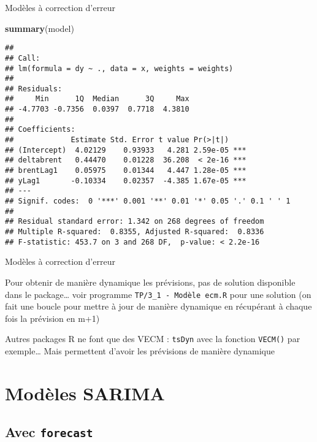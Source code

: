 \documentclass[10pt,xcolor=table,color={dvipsnames,usenames},ignorenonframetext,usepdftitle=false,french]{beamer}
\newenvironment{Shaded}{\begin{snugshade}}{\end{snugshade}}
\newcommand{\KeywordTok}[1]{\textcolor[rgb]{0.13,0.29,0.53}{\textbf{#1}}}
\newcommand{\NormalTok}[1]{#1}
\begin{document}
\begin{frame}[fragile]{Modèles à correction d'erreur}
\protect\hypertarget{moduxe8les-uxe0-correction-derreur}{}

\begin{Shaded}
\begin{Highlighting}[]
\KeywordTok{summary}\NormalTok{(model)}
\end{Highlighting}
\end{Shaded}

\begin{verbatim}
## 
## Call:
## lm(formula = dy ~ ., data = x, weights = weights)
## 
## Residuals:
##     Min      1Q  Median      3Q     Max 
## -4.7703 -0.7356  0.0397  0.7718  4.3810 
## 
## Coefficients:
##             Estimate Std. Error t value Pr(>|t|)    
## (Intercept)  4.02129    0.93933   4.281 2.59e-05 ***
## deltabrent   0.44470    0.01228  36.208  < 2e-16 ***
## brentLag1    0.05975    0.01344   4.447 1.28e-05 ***
## yLag1       -0.10334    0.02357  -4.385 1.67e-05 ***
## ---
## Signif. codes:  0 '***' 0.001 '**' 0.01 '*' 0.05 '.' 0.1 ' ' 1
## 
## Residual standard error: 1.342 on 268 degrees of freedom
## Multiple R-squared:  0.8355, Adjusted R-squared:  0.8336 
## F-statistic: 453.7 on 3 and 268 DF,  p-value: < 2.2e-16
\end{verbatim}

\end{frame}

\begin{frame}[fragile]{Modèles à correction d'erreur}
\protect\hypertarget{moduxe8les-uxe0-correction-derreur-1}{}

Pour obtenir de manière dynamique les prévisions, pas de solution
disponible dans le package\ldots{} voir programme
\texttt{TP/3\_1\ -\ Modèle\ ecm.R} pour une solution (on fait une boucle
pour mettre à jour de manière dynamique en récupérant à chaque fois la
prévision en m+1)

Autres packages R ne font que des VECM : \texttt{tsDyn} avec la fonction
\texttt{VECM()} par exemple\ldots{} Mais permettent d'avoir les
prévisions de manière dynamique

\end{frame}

\hypertarget{moduxe8les-sarima}{%
\section{Modèles SARIMA}\label{moduxe8les-sarima}}

\hypertarget{avec-forecast}{%
\subsection{\texorpdfstring{Avec
\texttt{forecast}}{Avec forecast}}\label{avec-forecast}}
\end{document}

